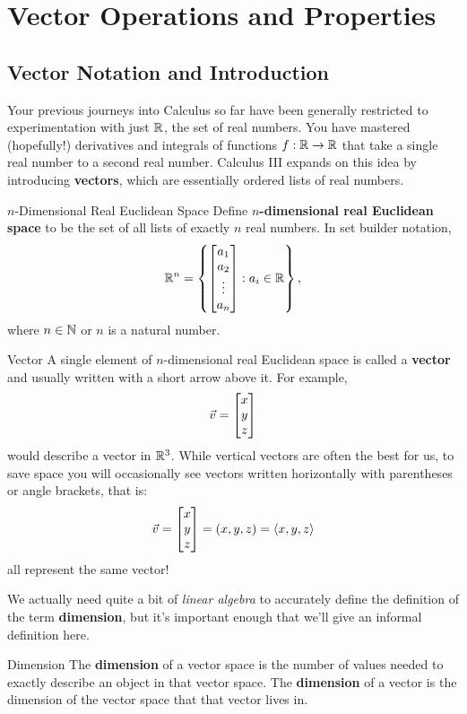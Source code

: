 \section{Vector Operations and Properties}
\subsection{Vector Notation and Introduction}
Your previous journeys into Calculus so far have been generally restricted to experimentation with just $\mathbb{R}$, the set of real numbers. You have mastered (hopefully!) derivatives and integrals of functions $f:\mathbb{R}\to\mathbb{R}$ that take a single real number to a second real number. Calculus III expands on this idea by introducing \textbf{vectors}, which are essentially ordered lists of real numbers.

\begin{definition}{$n$-Dimensional Real Euclidean Space}
Define \textbf{$n$-dimensional real Euclidean space} to be the set of all lists of exactly $n$ real numbers. In set builder notation, $$\mathbb{R}^n=\left\lbrace \begin{bmatrix} a_1 \\ a_2 \\ \vdots \\ a_n\end{bmatrix}:a_i\in\mathbb{R}\right\rbrace, $$ where $n\in\mathbb{N}$ or $n$ is a natural number.
\end{definition}

\begin{definition}{Vector}
A single element of $n$-dimensional real Euclidean space is called a \textbf{vector} and usually written with a short arrow above it. For example, $$\vec{v}=\begin{bmatrix}x\\y\\z\end{bmatrix}$$ would describe a vector in $\mathbb{R}^3$. While vertical vectors are often the best for us, to save space you will occasionally see vectors written horizontally with parentheses or angle brackets, that is:
$$\vec{v}=\begin{bmatrix}x\\y\\z\end{bmatrix}=(x,y,z)=\langle x,y,z\rangle$$ all represent the same vector!
\end{definition}

We actually need quite a bit of \textit{linear algebra} to accurately define the definition of the term \textbf{dimension}, but it's important enough that we'll give an informal definition here.

\begin{definition}{Dimension}
The \textbf{dimension} of a vector space is the number of values needed to exactly describe an object in that vector space. The \textbf{dimension} of a vector is the dimension of the vector space that that vector lives in.
\end{definition}

